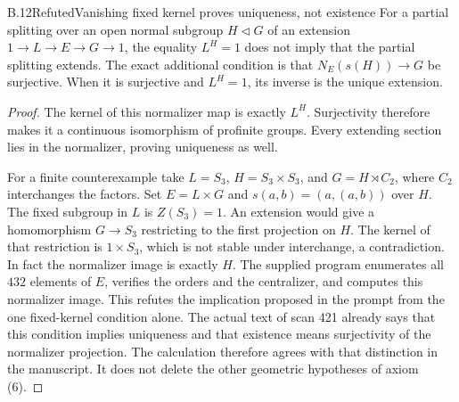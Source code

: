 \begin{statement}{B.12}{Refuted}{Vanishing fixed kernel proves uniqueness, not existence}
For a partial splitting over an open normal subgroup $H\triangleleft G$
of an extension $1\to L\to E\to G\to1$, the equality $L^H=1$
does not imply that the partial splitting extends.  The exact
additional condition is that $N_E(s(H))\to G$ be surjective.
When it is surjective and $L^H=1$, its inverse is the unique extension.
\end{statement}
\begin{proof}
The kernel of this normalizer map is exactly $L^H$.
Surjectivity therefore makes it a continuous isomorphism of profinite
groups.  Every extending section lies in the normalizer, proving
uniqueness as well.

For a finite counterexample take
$L=S_3$, $H=S_3\times S_3$, and
$G=H\rtimes C_2$, where $C_2$ interchanges the factors.
Set $E=L\times G$ and $s(a,b)=(a,(a,b))$ over $H$.
The fixed subgroup in $L$ is $Z(S_3)=1$.
An extension would give a homomorphism $G\to S_3$ restricting to the
first projection on $H$.  The kernel of that restriction is
$1\times S_3$, which is not stable under interchange, a contradiction.
In fact the normalizer image is exactly $H$.
The supplied program enumerates all $432$ elements of $E$, verifies
the orders and the centralizer, and computes this normalizer image.
This refutes the implication proposed in the prompt from the
one fixed-kernel condition alone. The actual text of scan 421
already says that this condition implies uniqueness and that
existence means surjectivity of the normalizer projection.
The calculation therefore agrees with that distinction in
the manuscript. It does not delete the other geometric
hypotheses of axiom (6).
\end{proof}

